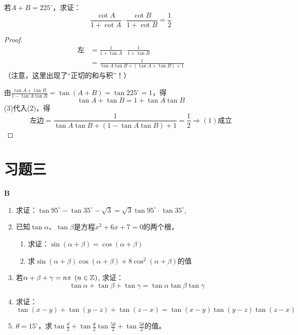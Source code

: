 \begin{example}
若$A+B=225^{\circ}$，求证：
\begin{equation}
    \frac{\cot A}{1+\cot A}\cdot \frac{\cot B}{1+\cot B}=\frac{1}{2}\tag{1}
\end{equation}
\end{example}

\begin{proof}
\begin{align}
\text{左}&=\frac{1}{1+\tan A}\cdot \frac{1}{1+\tan B}\nonumber\\
&=\frac{1}{\tan A\tan B+(\tan A+\tan B)+1}\tag{2}
\end{align}
（注意，这里出现了“正切的和与积”！）

由$\frac{\tan A+\tan B}{1-\tan A\tan B}=\tan(A+B)=\tan 225^{\circ}=1$，得
\begin{equation}
    \tan A+\tan B=1+\tan A\tan B\tag{3}
\end{equation}
(3)代入(2)，得
\[\text{左边}=\frac{1}{\tan A\tan B+(1-\tan A\tan B)+1}=\frac{1}{2}\Rightarrow (1)\text{成立}\]
  \end{proof}  

\section*{习题三}  
\begin{center}
    \bfseries B
\end{center}
    
\begin{enumerate}
    \item 求证：$ \tan 95^\circ-\tan 35^\circ-\sqrt{3}=\sqrt{3} \tan 95^\circ\cdot\tan 35^\circ$,
    \item 已知$\tan \alpha$、$\tan \beta$是方程$x^2+6x+7=0$的两个根，
\begin{enumerate}[(1)]
    \item 求证：$\sin(\alpha+\beta)=\cos(\alpha+\beta)$
\item 求$\sin(\alpha+\beta)\cos(\alpha+\beta)+8\cos^2(\alpha+\beta)$的值
\end{enumerate}
\item 若$\alpha+\beta+\gamma=n\pi\; \left(n\in \mathbb{Z}\right)$, 求证：
$$\tan\alpha+\tan \beta+\tan \gamma=\tan \alpha\tan \beta\tan \gamma$$
\item 求证：$$\tan (x-y)+\tan (y-z)+\tan (z-x)=\tan (x-y)\tan (y-z)\tan (z-x)$$
\item $\theta=15^{\circ}$，求$ \tan \frac\theta2+\tan \frac\theta2\tan \frac{5\theta}{2}+\tan \frac{5\theta}{2}$的值。
\end{enumerate}

